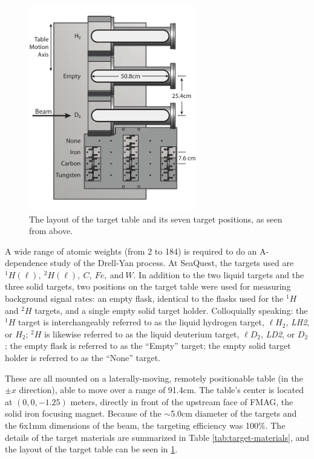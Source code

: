 \begin{figure}[p]
	\begin{center}
		\includegraphics[width=0.65\textwidth]{figures/target-tableLayout.pdf}
		\caption{The layout of the target table and its seven target positions, as seen from above.}
		\label{fig:table-layout}
	\end{center}
\end{figure}


A wide range of atomic weights (from 2 to 184) is required to do an A-dependence study of the Drell-Yan process.
At SeaQuest, the targets used are $^1H (\ell),\ ^2H (\ell),\ C,\ Fe,\ $and$\ W$. In addition to the two liquid targets
and the three solid targets, two positions on the target table were used for measuring background signal rates:
an empty flask, identical to the flasks used for the $^1H$ and $^2H$ targets, and a single empty solid target holder.
Colloquially speaking: the $^1H$ target is interchangeably referred to as the liquid hydrogen target, $\ell H_2$,
\emph{LH2}, or $H_2$; $^2H$ is likewise referred to as the liquid deuterium target, $\ell D_2$, \emph{LD2}, or $D_2$;
the empty flask is referred to as the ``Empty'' target; the empty solid target holder is referred to as the ``None'' target.

These are all mounted on a laterally-moving, remotely positionable table (in the $\pm x$ direction), able to move
over a range of 91.4cm. The table's center is located at $(0, 0, -1.25)$ meters, directly in front of the upstream face
of FMAG, the solid iron focusing magnet. Because of the $\sim$5.0cm diameter of the targets and the 6x1mm dimensions of the beam, the targeting efficiency was 100\%. The details of the target materials are summarized in Table \ref{tab:target-materials}, and the layout of the target table can be seen in \ref{fig:table-layout}.

